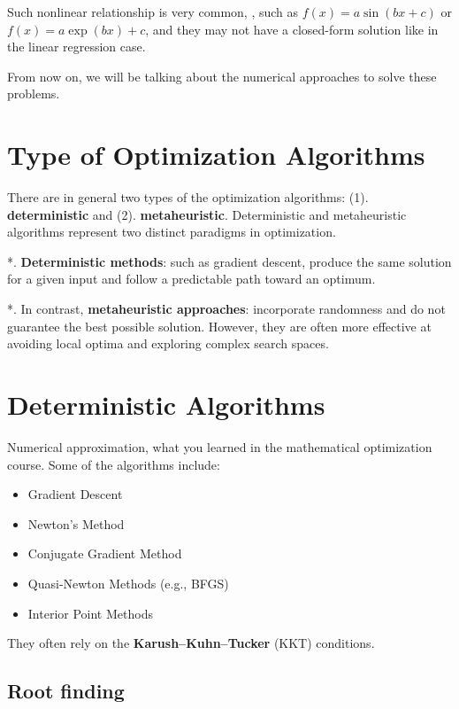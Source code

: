 \documentclass[
  letterpaper,
  DIV=11,
  numbers=noendperiod]{scrreprt}
\providecommand{\tightlist}{%
  \setlength{\itemsep}{0pt}\setlength{\parskip}{0pt}}
\begin{document}
Such nonlinear relationship is very common, , such as
\(f(x) = a\sin(bx + c)\) or \(f(x) = a\exp(bx) + c\), and they may not
have a closed-form solution like in the linear regression case.

From now on, we will be talking about the numerical approaches to solve
these problems.

\section{Type of Optimization
Algorithms}\label{type-of-optimization-algorithms}

There are in general two types of the optimization algorithms: (1).
\textbf{deterministic} and (2). \textbf{metaheuristic}. Deterministic
and metaheuristic algorithms represent two distinct paradigms in
optimization.

*. \textbf{Deterministic methods}: such as gradient descent, produce the
same solution for a given input and follow a predictable path toward an
optimum.

*. In contrast, \textbf{metaheuristic approaches}: incorporate
randomness and do not guarantee the best possible solution. However,
they are often more effective at avoiding local optima and exploring
complex search spaces.

\section{Deterministic Algorithms}\label{deterministic-algorithms}

Numerical approximation, what you learned in the mathematical
optimization course. Some of the algorithms include:

\begin{itemize}
\tightlist
\item
  Gradient Descent
\item
  Newton's Method
\item
  Conjugate Gradient Method
\item
  Quasi-Newton Methods (e.g., BFGS)
\item
  Interior Point Methods
\end{itemize}

They often rely on the \textbf{Karush--Kuhn--Tucker} (KKT) conditions.

\subsection{Root finding}\label{root-finding}
\end{document}
